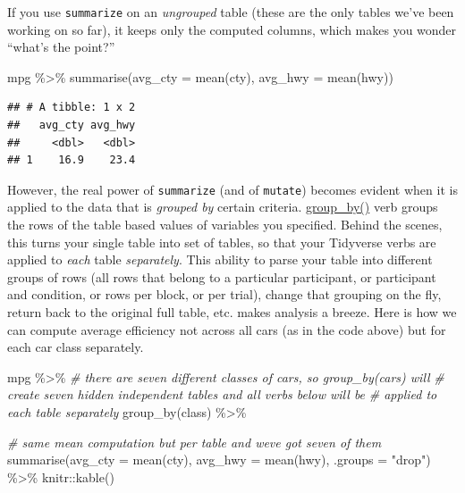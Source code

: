 \documentclass[
]{book}
\newenvironment{Shaded}{\begin{snugshade}}{\end{snugshade}}
\newcommand{\AttributeTok}[1]{\textcolor[rgb]{0.77,0.63,0.00}{#1}}
\newcommand{\CommentTok}[1]{\textcolor[rgb]{0.56,0.35,0.01}{\textit{#1}}}
\newcommand{\FunctionTok}[1]{\textcolor[rgb]{0.00,0.00,0.00}{#1}}
\newcommand{\NormalTok}[1]{#1}
\newcommand{\SpecialCharTok}[1]{\textcolor[rgb]{0.00,0.00,0.00}{#1}}
\newcommand{\StringTok}[1]{\textcolor[rgb]{0.31,0.60,0.02}{#1}}
\begin{document}
If you use \texttt{summarize} on an \emph{ungrouped} table (these are the only tables we've been working on so far), it keeps only the computed columns, which makes you wonder ``what's the point?''

\begin{Shaded}
\begin{Highlighting}[]
\NormalTok{mpg }\SpecialCharTok{\%\textgreater{}\%}
  \FunctionTok{summarise}\NormalTok{(}\AttributeTok{avg\_cty =} \FunctionTok{mean}\NormalTok{(cty),}
            \AttributeTok{avg\_hwy =} \FunctionTok{mean}\NormalTok{(hwy))}
\end{Highlighting}
\end{Shaded}

\begin{verbatim}
## # A tibble: 1 x 2
##   avg_cty avg_hwy
##     <dbl>   <dbl>
## 1    16.9    23.4
\end{verbatim}

However, the real power of \texttt{summarize} (and of \texttt{mutate}) becomes evident when it is applied to the data that is \emph{grouped by} certain criteria. \href{https://dplyr.tidyverse.org/reference/group_by.html}{group\_by()} verb groups the rows of the table based values of variables you specified. Behind the scenes, this turns your single table into set of tables, so that your Tidyverse verbs are applied to \emph{each} table \emph{separately}. This ability to parse your table into different groups of rows (all rows that belong to a particular participant, or participant and condition, or rows per block, or per trial), change that grouping on the fly, return back to the original full table, etc. makes analysis a breeze. Here is how we can compute average efficiency not across all cars (as in the code above) but for each car class separately.

\begin{Shaded}
\begin{Highlighting}[]
\NormalTok{mpg }\SpecialCharTok{\%\textgreater{}\%}
  \CommentTok{\# there are seven different classes of cars, so group\_by(cars)  will}
  \CommentTok{\# create seven hidden independent tables and all verbs below will be }
  \CommentTok{\# applied to each table separately}
  \FunctionTok{group\_by}\NormalTok{(class)  }\SpecialCharTok{\%\textgreater{}\%}
  
  \CommentTok{\# same mean computation but per table and we\textquotesingle{}ve got seven of them}
  \FunctionTok{summarise}\NormalTok{(}\AttributeTok{avg\_cty =} \FunctionTok{mean}\NormalTok{(cty),}
            \AttributeTok{avg\_hwy =} \FunctionTok{mean}\NormalTok{(hwy), }\AttributeTok{.groups =} \StringTok{"drop"}\NormalTok{) }\SpecialCharTok{\%\textgreater{}\%}
\NormalTok{  knitr}\SpecialCharTok{::}\FunctionTok{kable}\NormalTok{()}
\end{Highlighting}
\end{Shaded}
\end{document}
